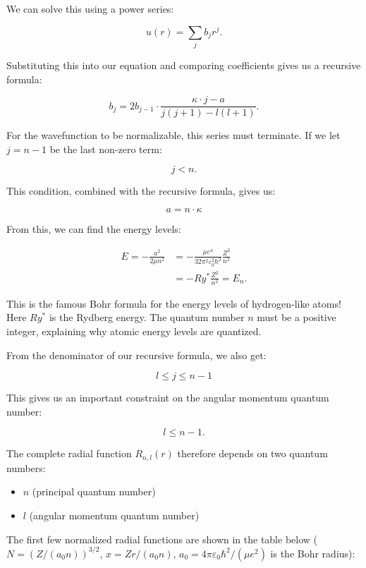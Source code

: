 \documentclass[
  a4paper,
]{book}
\providecommand{\tightlist}{%
  \setlength{\itemsep}{0pt}\setlength{\parskip}{0pt}}
\begin{document}
We can solve this using a power series:

\[
u \left(r\right) = \sum_j b_j r^j \mathrm{.}
\]

Substituting this into our equation and comparing coefficients gives us
a recursive formula:

\[
b_j = 2 b_{j-1} \cdot \frac{\kappa \cdot j -a}{j \left( j+1 \right) - l \left( l+1 \right)} \mathrm{.}
\]

For the wavefunction to be normalizable, this series must terminate. If
we let \(j=n-1\) be the last non-zero term:

\[
j < n \mathrm{.}
\]

This condition, combined with the recursive formula, gives us:

\[
a = n \cdot \kappa
\]

From this, we can find the energy levels:

\[
\begin{aligned}
E = - \frac{a^2}{2\mu n^2} & =  - \frac{\mu e^4}{32 \pi^2 \varepsilon_0^2 \hbar^2} \frac{Z^2}{n^2}\\
{} & =  - Ry^{\ast} \frac{Z^2}{n^2} = E_n \mathrm{.}
\end{aligned}
\]

This is the famous Bohr formula for the energy levels of hydrogen-like
atoms! Here \(Ry^*\) is the Rydberg energy. The quantum number \(n\)
must be a positive integer, explaining why atomic energy levels are
quantized.

From the denominator of our recursive formula, we also get:

\[
l \le j \le n-1
\]

This gives us an important constraint on the angular momentum quantum
number:

\[
l \le n-1 \mathrm{.}
\]

The complete radial function \(R_{n,l}(r)\) therefore depends on two
quantum numbers:

\begin{itemize}
\tightlist
\item
  \(n\) (principal quantum number)
\item
  \(l\) (angular momentum quantum number)
\end{itemize}

The first few normalized radial functions are shown in the table below
(\(N = \left(Z/\left( a_0 n\right)\right)^{3/2}\),
\(x = Z r / \left(a_0 n\right)\),
\(a_0 = 4 \pi \varepsilon_0 \hbar^2 / \left(\mu e^2 \right)\) is the
Bohr radius):
\end{document}
